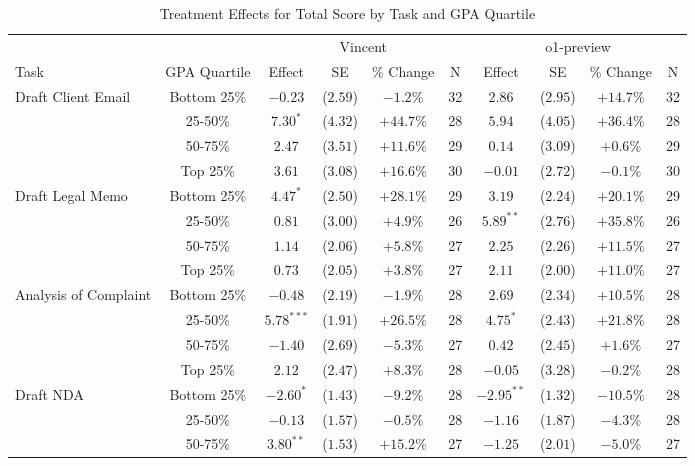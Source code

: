 \begin{table}[!htbp]
\centering
\caption{Treatment Effects for Total Score by Task and GPA Quartile}
\label{tab:total_score_gpa}
\begin{tabular}{lccccccccc}
\hline\hline
& & \multicolumn{4}{c}{Vincent} & \multicolumn{4}{c}{o1-preview} \\
\cline{3-10}
Task & GPA Quartile & Effect & SE & \% Change & N & Effect & SE & \% Change & N \\
\hline
\multirow{4}{*}{Draft Client Email} & Bottom 25\% & $-0.23$ & ($2.59$) & $-1.2\%$ & 32 & $2.86$ & ($2.95$) & $+14.7\%$ & 32 \\
& 25-50\% & $7.30^{*}$ & ($4.32$) & $+44.7\%$ & 28 & $5.94$ & ($4.05$) & $+36.4\%$ & 28 \\
& 50-75\% & $2.47$ & ($3.51$) & $+11.6\%$ & 29 & $0.14$ & ($3.09$) & $+0.6\%$ & 29 \\
& Top 25\% & $3.61$ & ($3.08$) & $+16.6\%$ & 30 & $-0.01$ & ($2.72$) & $-0.1\%$ & 30 \\
\hline
\multirow{4}{*}{Draft Legal Memo} & Bottom 25\% & $4.47^{*}$ & ($2.50$) & $+28.1\%$ & 29 & $3.19$ & ($2.24$) & $+20.1\%$ & 29 \\
& 25-50\% & $0.81$ & ($3.00$) & $+4.9\%$ & 26 & $5.89^{**}$ & ($2.76$) & $+35.8\%$ & 26 \\
& 50-75\% & $1.14$ & ($2.06$) & $+5.8\%$ & 27 & $2.25$ & ($2.26$) & $+11.5\%$ & 27 \\
& Top 25\% & $0.73$ & ($2.05$) & $+3.8\%$ & 27 & $2.11$ & ($2.00$) & $+11.0\%$ & 27 \\
\hline
\multirow{4}{*}{Analysis of Complaint} & Bottom 25\% & $-0.48$ & ($2.19$) & $-1.9\%$ & 28 & $2.69$ & ($2.34$) & $+10.5\%$ & 28 \\
& 25-50\% & $5.78^{***}$ & ($1.91$) & $+26.5\%$ & 28 & $4.75^{*}$ & ($2.43$) & $+21.8\%$ & 28 \\
& 50-75\% & $-1.40$ & ($2.69$) & $-5.3\%$ & 27 & $0.42$ & ($2.45$) & $+1.6\%$ & 27 \\
& Top 25\% & $2.12$ & ($2.47$) & $+8.3\%$ & 28 & $-0.05$ & ($3.28$) & $-0.2\%$ & 28 \\
\hline
\multirow{4}{*}{Draft NDA} & Bottom 25\% & $-2.60^{*}$ & ($1.43$) & $-9.2\%$ & 28 & $-2.95^{**}$ & ($1.32$) & $-10.5\%$ & 28 \\
& 25-50\% & $-0.13$ & ($1.57$) & $-0.5\%$ & 28 & $-1.16$ & ($1.87$) & $-4.3\%$ & 28 \\
& 50-75\% & $3.80^{**}$ & ($1.53$) & $+15.2\%$ & 27 & $-1.25$ & ($2.01$) & $-5.0\%$ & 27 \\

\end{tabular}
\end{table}
